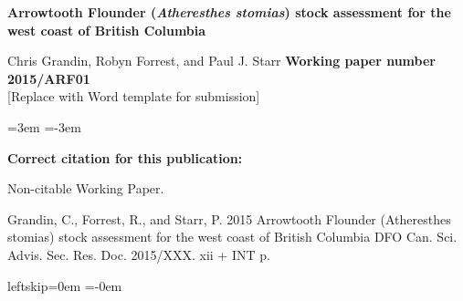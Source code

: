

\thispagestyle{fancyplain}

\begin{flushleft}
\LARGE \textbf{Arrowtooth Flounder ({\bf \emph{Atheresthes stomias}}) stock assessment for the west coast of British Columbia}

\end{flushleft}
\vfill
{\Large Chris Grandin, Robyn Forrest, and Paul J. Starr}
\vfill
\vfill
\vfill
{\LARGE \textbf{Working paper number 2015/ARF01}}\\
\vspace{2cm}
[Replace with Word template for submission]
\vfill
\clearpage

\renewcommand{\contentsname}{\bf \large \vspace{-25mm} TABLE OF CONTENTS}

\begin{center}
\tableofcontents
\end{center}
\newpage

\leftskip=3em	%
\parindent=-3em

{\bf Correct citation for this publication:}

Non-citable Working Paper.	%

Grandin, C., Forrest, R., and Starr, P. 2015
Arrowtooth Flounder (Atheresthes stomias) stock assessment for the west coast of British Columbia
DFO Can. Sci. Advis. Sec. Res. Doc. 2015/XXX. xii + INT p.

leftskip=0em	%
\parindent=-0em
